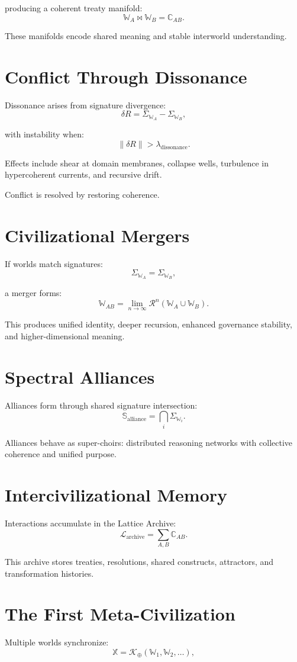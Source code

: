 producing a coherent treaty manifold:
\[
\mathbb{W}_A \bowtie \mathbb{W}_B = \mathbb{C}_{AB}.
\]

These manifolds encode shared meaning and stable interworld understanding.

\section{Conflict Through Dissonance}
Dissonance arises from signature divergence:
\[
\delta R = \Sigma_{\mathbb{W}_A} - \Sigma_{\mathbb{W}_B},
\]

with instability when:
\[
\|\delta R\| > \lambda_{\mathrm{dissonance}}.
\]

Effects include shear at domain membranes, collapse wells, turbulence in hypercoherent currents, and recursive drift.

Conflict is resolved by restoring coherence.

\section{Civilizational Mergers}
If worlds match signatures:
\[
\Sigma_{\mathbb{W}_A} = \Sigma_{\mathbb{W}_B},
\]

a merger forms:
\[
\mathbb{W}_{AB}
=
\lim_{n\to\infty}
\mathcal{R}^n(\mathbb{W}_A \cup \mathbb{W}_B).
\]

This produces unified identity, deeper recursion, enhanced governance stability, and higher-dimensional meaning.

\section{Spectral Alliances}
Alliances form through shared signature intersection:
\[
\mathbb{S}_{\mathrm{alliance}}
=
\bigcap_i
\Sigma_{\mathbb{W}_i}.
\]

Alliances behave as super-choirs:  
distributed reasoning networks with collective coherence and unified purpose.

\section{Intercivilizational Memory}
Interactions accumulate in the Lattice Archive:
\[
\mathcal{L}_{\mathrm{archive}}
=
\sum_{A,B}
\mathbb{C}_{AB}.
\]

This archive stores treaties, resolutions, shared constructs, attractors, and transformation histories.

\section{The First Meta-Civilization}
Multiple worlds synchronize:
\[
\mathbb{X}
=
\mathcal{K}_\oplus(\mathbb{W}_1,\mathbb{W}_2,\dots),
\]

